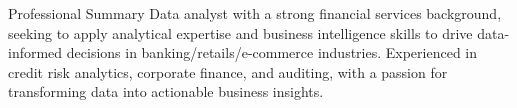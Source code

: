 \documentclass{resume} %
\begin{document}

\begin{rSection}{Professional Summary}
{Data analyst with a strong financial services background, seeking to apply analytical expertise and business intelligence skills to drive data-informed decisions in banking/retails/e-commerce industries. Experienced in credit risk analytics, corporate finance, and auditing, with a passion for transforming data into actionable business insights.}
\end{rSection}

\end{document}
